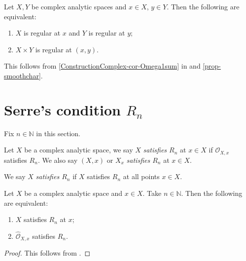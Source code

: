 \begin{proposition}\label{prop-regularlocusproduct}
    Let $X,Y$ be complex analytic spaces and $x\in X$, $y\in Y$. Then the following are equivalent:
    \begin{enumerate}
        \item $X$ is regular at $x$ and $Y$ is regular at $y$;
        \item $X\times Y$ is regular at $(x,y)$.
    \end{enumerate}
\end{proposition}
This follows from \cref{ConstructionComplex-cor-Omega1sum} in  and \cref{prop-smoothchar}.
\iffalse
\begin{proof}
    By \cref{Local-thm-complocalringtest} in \nameref{Local-chap-local},
    \[
        \hat{\mathcal{O}}_{X\times Y,(x,y)}=\hat{\mathcal{O}}_{X,x}\hat{\otimes}\hat{\mathcal{O}}_{Y,y}.  
    \]
    As a noetherian local ring is regular if and only if its completion is by \cite[\href{https://stacks.math.columbia.edu/tag/07NY}{Tag 07NY}]{stacks-project}, it suffices to prove the corresponding algebraic result, which is well-known.
\end{proof}
\fi

\section{Serre's condition \texorpdfstring{$R_n$}{Rn}}
Fix $n\in \mathbb{N}$ in this section.
\begin{definition}
    Let $X$ be a complex analytic space, we say $X$ \emph{satisfies $R_n$} at $x\in X$ if $\mathcal{O}_{X,x}$ satisfies $R_n$. We also say $(X,x)$ or $X_x$  \emph{satisfies $R_n$} at $x\in X$.

    We say $X$  \emph{satisfies $R_n$} if $X$ satisfies $R_n$ at all points $x\in X$. 
\end{definition}

\begin{proposition}\label{prop-Rncompletion}
    Let $X$ be a complex analytic space and $x\in X$. Take $n\in \mathbb{N}$. Then the following are equivalent:
    \begin{enumerate}
        \item $X$ satisfies $R_n$ at $x$;
        \item $\hat{\mathcal{O}}_{X,x}$ satisfies $R_n$.
    \end{enumerate}
\end{proposition}
\begin{proof}
    This follows from \cite[\href{https://stacks.math.columbia.edu/tag/07NY}{Tag 07NY}]{stacks-project}.
\end{proof}

